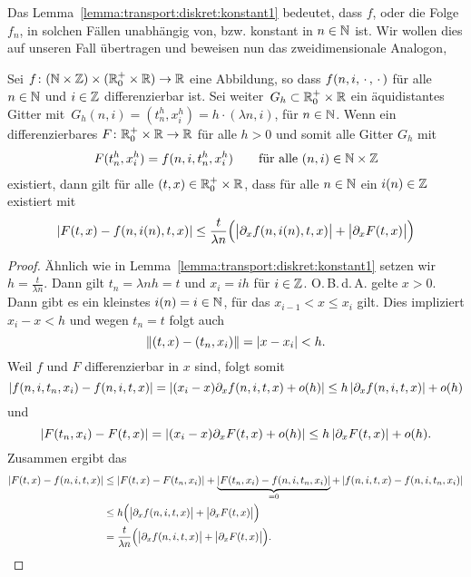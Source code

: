 Das Lemma~\ref{lemma:transport:diskret:konstant1} bedeutet, dass $f$, oder die Folge $f_n$, in solchen Fällen unabhängig von, bzw. konstant in $n \in \mathbb N$ ist.
Wir wollen dies auf unseren Fall übertragen und beweisen nun das zweidimensionale Analogon, 

\begin{lemma}\label{lemma:transport:diskret:konvergenz_gitter}
Sei $f\colon (\mathbb N \times \mathbb Z) \times (\mathbb R^+_0 \times \mathbb R) \to \mathbb R$ eine Abbildung, so dass $f(n,i,\, \cdot \,,\, \cdot \,)$ für alle $n \in \mathbb N$ und $i \in \mathbb Z$ differenzierbar ist.
Sei weiter\, $G_h \subset \mathbb R^+_0 \times \mathbb R$ ein äquidistantes Gitter mit\, $G_h(n,i) = (t^h_n, x^h_i) = h \cdot (\lambda n, i)$, für $n \in \mathbb N$.
Wenn ein differenzierbares $F\colon \mathbb R^+_0 \times \mathbb R \to \mathbb R$ für alle $h > 0$ und somit alle Gitter $G_h$ mit
\begin{align}\label{eq:lemma:diag:voraussetzung}
F(t^h_n, x^h_i) = f(n, i, t^h_n, x^h_i) \qquad \text{für alle $(n,i) \in \mathbb N \times \mathbb Z$}
\end{align}
existiert, dann gilt für alle $(t, x) \in \mathbb R^+_0 \times \mathbb R$, dass für alle $n \in \mathbb N$ ein $i(n) \in \mathbb Z$ existiert mit
\begin{align}\label{eq:lemma:diag:aussage}
\left| F(t, x) - f(n, i(n), t, x) \right| \leq \frac {t}{\lambda n} \Bigl(\bigl\lvert \partial_x f(n, i(n), t, x) \bigr\rvert + \bigl\lvert \partial_x F(t, x) \bigr\rvert \Bigr)
\end{align}
\end{lemma}
\begin{proof}
Ähnlich wie in Lemma~\ref{lemma:transport:diskret:konstant1} setzen wir $h = \frac {t}{\lambda n}$.
Dann gilt $t_n = \lambda n h = t$ und $x_i = i h$ für $i \in \mathbb Z$.
O.\,B.\,d.\,A. gelte $x > 0$.
Dann gibt es ein kleinstes $i(n) = i \in \mathbb N$, für das $x_{i-1} < x \leq x_i$ gilt.
Dies impliziert $x_i - x < h$ und wegen $t_n = t$ folgt auch
\[ \left\lVert (t,x) - (t_n, x_i) \right\rVert = \left| x - x_i \right| < h. \]
Weil $f$ und $F$ differenzierbar in $x$ sind, folgt somit
\[ \left| f(n, i, t_n, x_i) - f(n, i, t, x) \right| = \left| (x_i - x) \partial_x f(n, i, t, x) + o(h) \right| \leq h \left| \partial_x f(n, i, t, x) \right| + o(h) \]
und
\[ \left| F(t_n, x_i) - F(t, x) \right| = \left| (x_i - x) \partial_x F(t, x) + o(h) \right| \leq h \left| \partial_x F(t, x) \right| + o(h). \]
Zusammen ergibt das
{\small
\begin{align*}
\left| F(t,x) - f(n, i, t, x) \right| &\leq \left| F(t, x) - F(t_n, x_i) \right| + \underbrace{\left| F(t_n, x_i) - f(n, i, t_n, x_i) \right|}_{= 0} + \left| f(n,i, t, x) - f(n, i, t_n, x_i) \right|\\
&\leq h \Bigl(\bigl\lvert \partial_x f(n, i, t, x) \bigr\rvert + \bigl\lvert \partial_x F(t, x) \bigr\rvert \Bigr)\\
&= \frac {t}{\lambda n} \Bigl(\bigl\lvert \partial_x f(n, i, t, x) \bigr\rvert + \bigl\lvert \partial_x F(t, x) \bigr\rvert \Bigr). \qedhere
\end{align*}
}
\end{proof}
